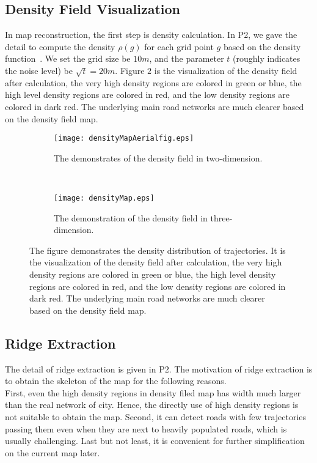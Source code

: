 \documentclass[11pt]{article}
\begin{document}
\subsection*{Density Field Visualization}
In map reconstruction, the first step is density calculation.  In P2,  we gave the detail to compute the density $\rho(g)$ for each grid point $g$ based on the density function~\cite{Wang15}. We set the grid size be $10m$, and the parameter $t$ (roughly indicates the noise level) be $\sqrt{t}=20 m$. Figure $2$ is the visualization of the density field after calculation, the very high density regions are colored in green or blue, the high level density regions are colored in red, and the low density regions are colored in dark red. The underlying main road networks are much clearer based on the density field map. 

\begin{figure*}[t!]
    \centering
    \begin{subfigure}[t]{0.5\textwidth}
        \centering
        \texttt{[image: densityMapAerialfig.eps]}
        \caption{The demonstrates of the density field in two-dimension.}
    \end{subfigure}%
    ~
    \begin{subfigure}[t]{0.5\textwidth}
        \centering
        \texttt{[image: densityMap.eps]}
        \caption{The demonstration of the density field in three-dimension.}
    \end{subfigure}
    \caption{The figure demonstrates the density distribution of trajectories. It is the visualization of the density field after calculation, the very high density regions are colored in green or blue, the high level density regions are colored in red, and the low density regions are colored in dark red. The underlying main road networks are much clearer based on the density field map.}
\end{figure*}

\subsection*{Ridge Extraction}
The detail of ridge extraction is given in P$2$. The motivation of ridge extraction is to obtain the skeleton of the map for the following reasons.\\
First, even the high density regions in density filed map has width  much larger than the real network of city. Hence, the directly use of high density regions is not suitable to obtain the map. Second, it
can detect roads with few trajectories passing them even when they
are next to heavily populated roads, which is usually
challenging. Last but not least, it is convenient for further simplification on the current map later.
\end{document}
